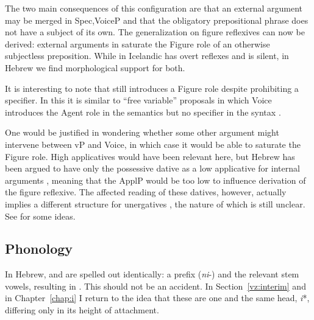 The two main consequences of this configuration are that an external argument may be merged in Spec,VoiceP and that the obligatory prepositional phrase does not have a subject of its own. The generalization on figure reflexives can now be derived: external arguments in {\tnif} saturate the Figure role of an otherwise subjectless preposition. While in Icelandic {\vz} has overt reflexes \citep[Ch.~3.2]{wood15springer} and {\pz} is silent, in Hebrew we find morphological support for both.

It is interesting to note that {\pz} still introduces a Figure role despite prohibiting a specifier. In this it is similar to ``free variable'' proposals in which Voice introduces the Agent role in the semantics but no specifier in the syntax \citep{legate14,akkus19jl}.

One would be justified in wondering whether some other argument might intervene between vP and Voice, in which case it would be able to saturate the Figure role. High applicatives would have been relevant here, but Hebrew has been argued to have only the possessive dative as a low applicative for internal arguments \citep[46]{pylkkanen08}, meaning that the ApplP would be too low to influence derivation of the figure reflexive. The affected reading of these datives, however, actually implies a different structure for unergatives \citep[59]{pylkkanen08}, the nature of which is still unclear. See \cite{barashersiegalboneh15,barashersiegalboneh16} for some ideas.
	
	\subsection{Phonology} \label{vz:pz:phono}
In Hebrew, {\vz} and {\pz} are spelled out identically: a prefix (\emph{ni}-) and the relevant stem vowels, resulting in {\tnif}. This should not be an accident. In Section~\ref{vz:interim} and in Chapter~\ref{chap:i} I return to the idea that these are one and the same head, \emph{i}*, differing only in its height of attachment.

